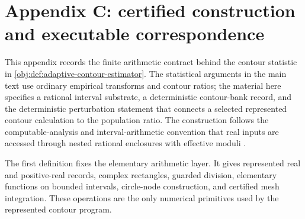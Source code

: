 \section{Appendix C: certified construction and executable correspondence}

This appendix records the finite arithmetic contract behind the contour statistic in \cref{obj:def:adaptive-contour-estimator}. The statistical arguments in the main text use ordinary empirical transforms and contour ratios; the material here specifies a rational interval substrate, a deterministic contour-bank record, and the deterministic perturbation statement that connects a selected represented contour calculation to the population ratio. The construction follows the computable-analysis and interval-arithmetic convention that real inputs are accessed through nested rational enclosures with effective moduli \citep{Weihrauch2000,Ko1991,Moore1966}.

The first definition fixes the elementary arithmetic layer. It gives represented real and positive-real records, complex rectangles, guarded division, elementary functions on bounded intervals, circle-node construction, and certified mesh integration. These operations are the only numerical primitives used by the represented contour program.

